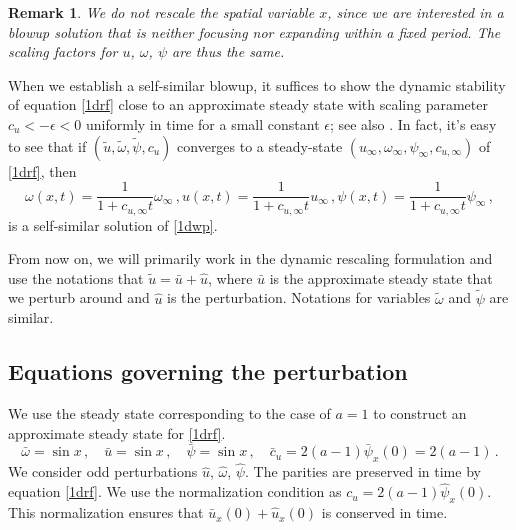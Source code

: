 \documentclass[12pt]{caltech_thesis}
\newtheorem{remark}[theorem]{Remark}
\numberwithin{equation}{section}
\begin{document}
\begin{remark}
We do not rescale the spatial variable $x$, since we are interested in a blowup solution that is neither focusing nor expanding within a fixed period. The scaling factors for $u$, $\omega$, $\psi$ are thus the same.
\end{remark}
When we establish a self-similar blowup, it suffices to show the dynamic stability of equation \eqref{1drf} close to an approximate steady state  with scaling parameter $c_u<-\epsilon<0$ uniformly in time for a small constant $\epsilon$; see also \cite{chen2021finite}. In fact, it's easy to see that if $(\tilde{u},\tilde{\omega},\tilde{\psi},c_u)$ converges to a steady-state $({u}_{\infty},{\omega}_{\infty},{\psi}_{\infty},c_{u,\infty})$ of \eqref{1drf}, then $$\omega(x,t)=\frac{1}{1+c_{u,\infty}t}{\omega}_{\infty}\,,u(x,t)=\frac{1}{1+c_{u,\infty}t}u_{\infty}\,,\psi(x,t)=\frac{1}{1+c_{u,\infty}t}{\psi}_{\infty}\,,$$
is a self-similar solution of \eqref{1dwp}. %
    
From now on, we will primarily work in the dynamic rescaling formulation and use the notations that $\tilde{u} =\bar{u}+\hat{u}$, where $\bar{u}$ is the approximate steady state that we perturb around and $\hat{u}$ is the perturbation. Notations for variables $\tilde{\omega}$ and $\tilde{\psi}$ are similar. 
\subsection{Equations governing the perturbation}
We use the steady state corresponding to the case of $a=1$ to construct an approximate steady state for \eqref{1drf}.
$$\bar{\omega}=\sin x\,,\quad\bar{u}=\sin x\,,\quad\bar{\psi}=\sin x\,,\quad \bar{c}_u=2(a-1)\bar{\psi}_x(0)=2(a-1)\,.$$
We consider odd perturbations $\hat{u}$, $\hat{\omega}$, $\hat{\psi}$. The parities are preserved in time by equation \eqref{1drf}.  We use the normalization condition as $c_u=2(a-1)\hat{\psi}_x(0)$. This normalization ensures that $\bar{u}_x(0)+\hat{u}_x(0)$ is conserved in time. 
\end{document}
